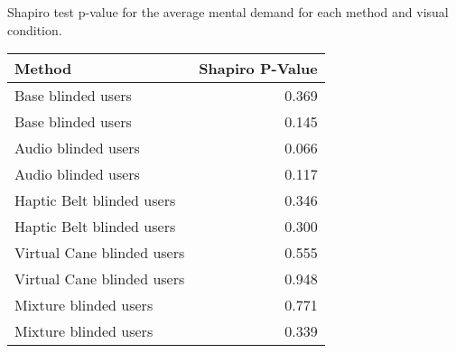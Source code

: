 
\centering
\caption{Shapiro test p-value for the average mental demand for each method and visual condition.}
\label{tab:shapiro_mental_demand_avg}
\begin{tabular}{lr}
\toprule
                    Method &  Shapiro P-Value \\
\midrule
        Base blinded users &            0.369 \\
        Base blinded users &            0.145 \\
       Audio blinded users &            0.066 \\
       Audio blinded users &            0.117 \\
 Haptic Belt blinded users &            0.346 \\
 Haptic Belt blinded users &            0.300 \\
Virtual Cane blinded users &            0.555 \\
Virtual Cane blinded users &            0.948 \\
     Mixture blinded users &            0.771 \\
     Mixture blinded users &            0.339 \\
\bottomrule
\end{tabular}
